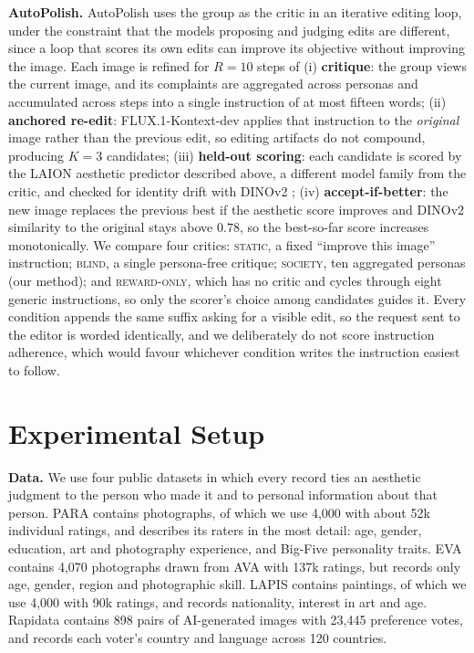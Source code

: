 \documentclass[runningheads]{llncs}
\begin{document}
\textbf{AutoPolish.} AutoPolish uses the group as the critic in an iterative editing loop, under the constraint that the models proposing and judging edits are different, since a loop that scores its own edits can improve its objective without improving the image. Each image is refined for $R=10$ steps of (i) \textbf{critique}: the group views the current image, and its complaints are aggregated across personas and accumulated across steps into a single instruction of at most fifteen words; (ii) \textbf{anchored re-edit}: FLUX.1-Kontext-dev \cite{flux2024} applies that instruction to the \emph{original} image rather than the previous edit, so editing artifacts do not compound, producing $K=3$ candidates; (iii) \textbf{held-out scoring}: each candidate is scored by the LAION aesthetic predictor described above, a different model family from the critic, and checked for identity drift with DINOv2 \cite{oquab2023}; (iv) \textbf{accept-if-better}: the new image replaces the previous best if the aesthetic score improves and DINOv2 similarity to the original stays above $0.78$, so the best-so-far score increases monotonically. We compare four critics: \textsc{static}, a fixed ``improve this image'' instruction; \textsc{blind}, a single persona-free critique; \textsc{society}, ten aggregated personas (our method); and \textsc{reward-only}, which has no critic and cycles through eight generic instructions, so only the scorer's choice among candidates guides it. Every condition appends the same suffix asking for a visible edit, so the request sent to the editor is worded identically, and we deliberately do not score instruction adherence, which would favour whichever condition writes the instruction easiest to follow.

\section{Experimental Setup}

\textbf{Data.} We use four public datasets in which every record ties an aesthetic judgment to the person who made it and to personal information about that person. PARA \cite{yang2022para} contains photographs, of which we use 4{,}000 with about 52k individual ratings, and describes its raters in the most detail: age, gender, education, art and photography experience, and Big-Five personality traits. EVA \cite{kang2020eva} contains 4{,}070 photographs drawn from AVA \cite{murray2012ava} with 137k ratings, but records only age, gender, region and photographic skill. LAPIS \cite{maerten2025lapis} contains paintings, of which we use 4{,}000 with 90k ratings, and records nationality, interest in art and age. Rapidata \cite{rapidata2024} contains 898 pairs of AI-generated images with 23{,}445 preference votes, and records each voter's country and language across 120 countries.
\end{document}
